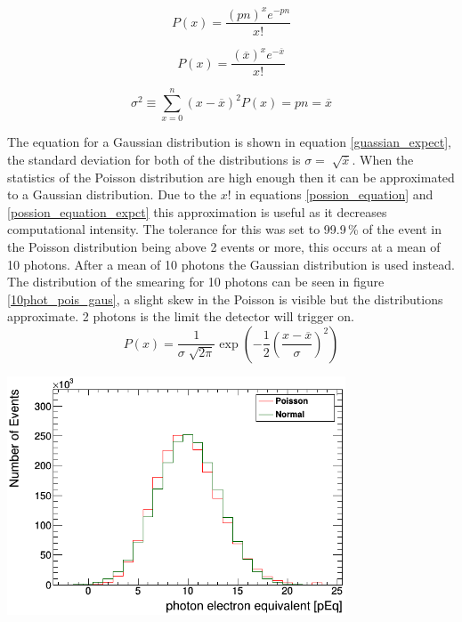 \documentclass[12pt,a4paper]{article}
\newenvironment{Figure}
  {\par\medskip\noindent\minipage{\linewidth}}
  {\endminipage\par\medskip}
\begin{document}
\begin{equation}
P(x) = \frac{(pn)^x e^{-pn}}{x!}  
\label{possion_equation}
\end{equation}

\begin{equation}
P(x) = \frac{(\overline{x})^x e^{-\overline{x}}}{x!}  
\label{possion_equation_expct}
\end{equation}

\begin{equation}
\sigma ^2 \equiv \sum_{x=0}^{n} (x-\overline{x})^2 P(x) = pn = \overline{x} 
\label{possion_var}
\end{equation}

The equation for a Gaussian distribution is shown in equation \ref{guassian_expect}, the standard deviation for both of the distributions is $\sigma=\sqrt[]{\overline{x}}$. When the statistics of the Poisson distribution are high enough then it can be approximated to a Gaussian distribution. Due to the $x!$ in equations \ref{possion_equation} and \ref{possion_equation_expct} this approximation is useful as it decreases computational intensity. The tolerance for this was set to 99.9\,\% of the event in the Poisson distribution being above 2 events or more, this occurs at a mean of 10 photons. After a mean of 10 photons the Gaussian distribution is used instead. The distribution of the smearing for 10 photons can be seen in figure \ref{10phot_pois_gaus}, a slight skew in the Poisson is visible but the distributions approximate. 2 photons is the limit the detector will trigger on. 
\begin{equation}
P(x) = \frac{1}{\sigma \sqrt[]{2 \pi}} \exp \left(-\frac{1}{2}\left(\frac{x-\overline{x}}{\sigma}\right)^{2}\right)
\label{guassian_expect}
\end{equation}

\begin{Figure}
 \centering
 \includegraphics[height=71mm]{10phot.png}
 \label{10phot_pois_gaus}
\end{Figure}
\end{document}
